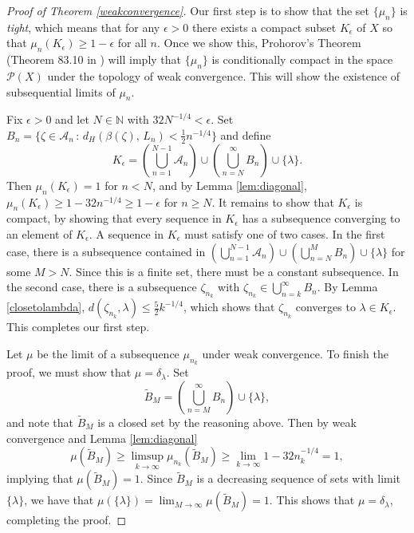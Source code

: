 \documentclass[preprint,12pt]{elsarticle}
\theoremstyle{definition}
\theoremstyle{remark}
\numberwithin{equation}{section}
\newcommand{\cP}{\mathcal{P}}
\begin{document}
\begin{proof}[Proof of Theorem \ref{weakconvergence}]

Our first step is to show that the set $\{\mu_n\}$ is {\it tight}, which means that for any $\epsilon >0$ there exists a compact subset $K_\epsilon$ of $X$ so that $\mu_n(K_\epsilon) \geq 1-\epsilon$ for all $n$.  Once we show this, Prohorov's Theorem (Theorem 83.10 in \cite{rogers_williams_2000}) will imply that $\{\mu_n\}$ is conditionally compact in the space $\cP(X)$ under the topology of weak convergence.  This will show the existence of subsequential limits of $\mu_n$.

Fix $\epsilon >0$ and let $N \in \mathbb{N}$ with $32N^{-1/4} < \epsilon$.
Set $B_n = \big\{ \zeta \in  \mathcal{A}_n  \, : \, d_H\left(\beta(\zeta), \, L_n \right) < \tfrac{1}{2} n^{-1/4} \big\}$ and define
$$K_\epsilon = \left( \bigcup_{n=1}^{N-1} \mathcal{A}_n  \right) \cup \left( \bigcup_{n=N}^\infty B_n \right) \cup \{ \lambda \}.$$
Then  $\mu_n(K_\epsilon) = 1$ for $n < N$, 
and by Lemma \ref{lem:diagonal}, $\mu_n(K_\epsilon) \geq 1- 32n^{-1/4} \geq 1-\epsilon$ for $n\geq N$.
It remains to show that $K_\epsilon$ is compact, by showing that every sequence in $K_\epsilon$ has a subsequence converging to an element of $K_\epsilon$.
A sequence in $K_\epsilon$ must satisfy one of two cases.  In the first case, there is a subsequence contained in 
$ \left( \bigcup_{n=1}^{N-1} \mathcal{A}_n  \right) \cup \left( \bigcup_{n=N}^M B_n \right) \cup \{\lambda\}$ for some $M>N$.
Since this is a finite set, there must be a constant subsequence.
In the second case, there is a subsequence $\zeta_{n_k}$ with $\zeta_{n_k} \in  \bigcup_{n=k}^\infty B_n $.
By Lemma \ref{closetolambda}, $d(\zeta_{n_k}, \lambda) \leq \frac{5}{2} k^{-1/4}$, 
 which shows that $\zeta_{n_k}$ converges to $\lambda \in K_\epsilon$.
 This completes our first step.

Let $\mu$ be the limit of a subsequence $\mu_{n_k}$ under weak convergence.  To finish the proof, we must show that $\mu = \delta_\lambda$.
Set 
$$\tilde{B}_M = \left( \bigcup_{n=M}^\infty B_n \right) \cup \{\lambda\},$$
and note that $\tilde{B}_M $ is a closed set by the reasoning above.
Then by weak convergence and  Lemma \ref{lem:diagonal}
$$\mu(\tilde B_M) \geq \limsup_{k \to \infty} \mu_{n_k}(\tilde B_M) \geq \lim_{k \to \infty} 1-32 n_k^{-1/4}=1,$$
implying that $\mu(\tilde B_M) =1$.  
Since $\tilde B_M$ is a decreasing sequence of sets with limit $\{\lambda \}$, we have that
$\displaystyle \mu(\{\lambda\}) = \lim_{M\to \infty} \mu (\tilde B_M) = 1.$
This shows that $\mu = \delta_\lambda$, completing the proof.
\end{proof}
\end{document}
